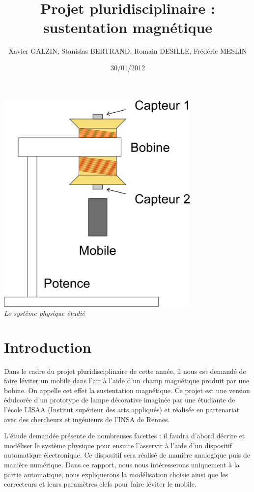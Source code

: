 \documentclass[11pt, french]{article} %
\title{Projet pluridisciplinaire : sustentation magnétique}
\author{Xavier GALZIN, Stanislas BERTRAND, Romain DESILLE, Frédéric MESLIN}
\date{30/01/2012}
\begin{document}
\maketitle

\begin{center}
	\vspace{0.6in}
	\includegraphics[width=10cm]{Automatique/system_physique.png} 
	\\
	\emph{Le système physique étudié}
\end{center}

\pagebreak

\section{Introduction}
\paragraph{}
Dans le cadre du projet pluridisciplinaire de cette année, il nous est demandé de faire léviter un mobile dans l'air à l'aide d'un champ magnétique produit par une bobine. On appelle cet effet la sustentation magnétique. Ce projet est une version édulcorée d'un prototype de lampe décorative imaginée par une étudiante de l'école LISAA (Institut supérieur des arts appliqués) et réalisée en partenariat avec des chercheurs et ingénieurs de l'INSA de Rennes.

L'étude demandée présente de nombreuses facettes : il faudra d'abord décrire et modéliser le système physique pour ensuite l'asservir à l'aide d'un dispositif automatique électronique. Ce dispositif sera réalisé de manière analogique puis de manière numérique. Dans ce rapport, nous nous intéresserons uniquement à la partie automatique, nous expliquerons la modélisation choisie ainsi que les correcteurs et leurs paramètres clefs pour faire léviter le mobile.
\end{document}
